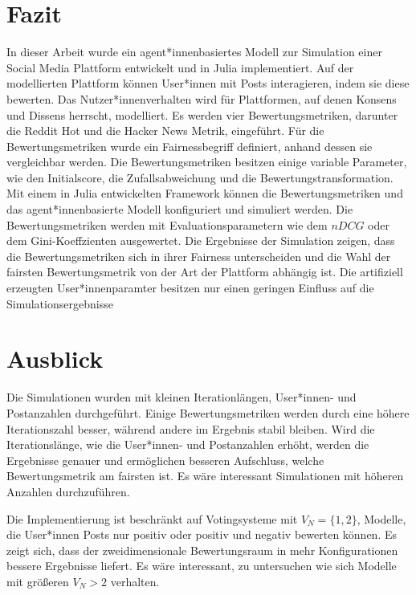 \chapter{Fazit}
In dieser Arbeit wurde ein agent*innenbasiertes Modell zur Simulation einer Social Media Plattform entwickelt und in Julia implementiert. Auf der modellierten Plattform können User*innen mit Posts interagieren, indem sie diese bewerten. Das Nutzer*innenverhalten wird für Plattformen, auf denen Konsens und Dissens herrscht, modelliert. Es werden vier Bewertungsmetriken, darunter die Reddit Hot und die Hacker News Metrik, eingeführt. Für die Bewertungsmetriken wurde ein Fairnessbegriff definiert, anhand dessen sie vergleichbar werden. Die Bewertungsmetriken besitzen einige variable Parameter, wie den Initialscore, die Zufallsabweichung und die Bewertungstransformation.  Mit einem in Julia entwickelten Framework können die Bewertungsmetriken und das agent*innenbasierte Modell konfiguriert und simuliert werden. Die Bewertungsmetriken werden mit Evaluationsparametern wie dem $nDCG$ oder dem Gini-Koeffzienten ausgewertet. Die Ergebnisse der Simulation zeigen, dass die Bewertungsmetriken sich in ihrer Fairness unterscheiden und die Wahl der fairsten Bewertungsmetrik von der Art der Plattform abhängig ist. Die artifiziell erzeugten User*innenparamter besitzen nur einen geringen Einfluss auf die Simulationsergebnisse


\begingroup
\renewcommand{\cleardoublepage}{}
\renewcommand{\clearpage}{}
\chapter{Ausblick}
\endgroup

Die Simulationen wurden mit kleinen Iterationlängen, User*innen- und Postanzahlen durchgeführt. Einige Bewertungsmetriken werden durch eine höhere Iterationszahl besser, während andere im Ergebnis stabil bleiben. Wird die Iterationslänge, wie die User*innen- und Postanzahlen erhöht, werden die Ergebnisse genauer und ermöglichen besseren Aufschluss, welche Bewertungsmetrik am fairsten ist. Es wäre interessant Simulationen mit höheren Anzahlen durchzuführen.

Die Implementierung ist beschränkt auf Votingsysteme mit  $V_N = \{1,2\}$, Modelle, die User*innen Posts nur positiv oder positiv und negativ bewerten können. Es zeigt sich, dass der zweidimensionale Bewertungsraum in mehr Konfigurationen bessere Ergebnisse liefert. Es wäre interessant, zu untersuchen wie sich Modelle mit größeren $V_N > 2$ verhalten.


